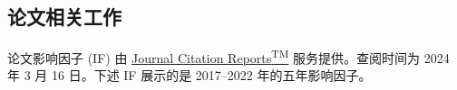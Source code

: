 

\subsection*{论文相关工作}

论文影响因子 (IF) 由 \href{https://jcr.clarivate.com/jcr/browse-journals}{Journal Citation Reports\textsuperscript{TM}} 服务提供。查阅时间为 2024 年 3 月 16 日。下述 IF 展示的是 2017--2022 年的五年影响因子。


